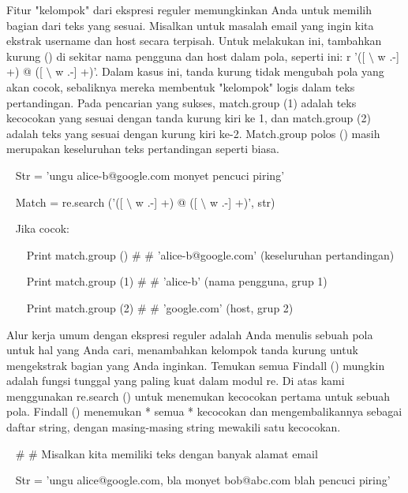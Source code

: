 \begin{12pt}
\begin{12pt}
\begin{12pt}
\begin{12pt}
\begin{12pt}
\begin{12pt}
\begin{12pt}
Fitur "kelompok" dari ekspresi reguler memungkinkan Anda untuk memilih bagian dari teks yang sesuai. Misalkan untuk masalah email yang ingin kita ekstrak username dan host secara terpisah. Untuk melakukan ini, tambahkan kurung () di sekitar nama pengguna dan host dalam pola, seperti ini: r '([ $  \setminus  $ w .-] +) @ ([ $  \setminus  $ w .-] +)'. Dalam kasus ini, tanda kurung tidak mengubah pola yang akan cocok, sebaliknya mereka membentuk "kelompok" logis dalam teks pertandingan. Pada pencarian yang sukses, match.group (1) adalah teks kecocokan yang sesuai dengan tanda kurung kiri ke 1, dan match.group (2) adalah teks yang sesuai dengan kurung kiri ke-2. Match.group polos () masih merupakan keseluruhan teks pertandingan seperti biasa. \par
\vspace{12pt}
\noindent 
~ Str = 'ungu alice-b@google.com monyet pencuci piring' \par
\noindent 
~ Match = re.search ('([ $  \setminus  $ w .-] +) @ ([ $  \setminus  $ w .-] +)', str) \par
\noindent 
~ Jika cocok: \par
\noindent 
~~~ Print match.group ()  $  \#  $ $  \#  $ 'alice-b@google.com' (keseluruhan pertandingan) \par
\noindent 
~~~ Print match.group (1)  $  \#  $ $  \#  $ 'alice-b' (nama pengguna, grup 1) \par
\noindent 
~~~ Print match.group (2)  $  \#  $ $  \#  $ 'google.com' (host, grup 2) \par
\vspace{12pt}
Alur kerja umum dengan ekspresi reguler adalah Anda menulis sebuah pola untuk hal yang Anda cari, menambahkan kelompok tanda kurung untuk mengekstrak bagian yang Anda inginkan. Temukan semua Findall () mungkin adalah fungsi tunggal yang paling kuat dalam modul re. Di atas kami menggunakan re.search () untuk menemukan kecocokan pertama untuk sebuah pola. Findall () menemukan * semua * kecocokan dan mengembalikannya sebagai daftar string, dengan masing-masing string mewakili satu kecocokan. \par
\vspace{12pt}
\vspace{12pt}
\noindent 
~  $  \#  $ $  \#  $ Misalkan kita memiliki teks dengan banyak alamat email \par
\noindent 
~ Str = 'ungu alice@google.com, bla monyet bob@abc.com blah pencuci piring' \par
\vspace{12pt}

\end{12pt}
\end{12pt}
\end{12pt}
\end{12pt}
\end{12pt}
\end{12pt}
\end{12pt}
